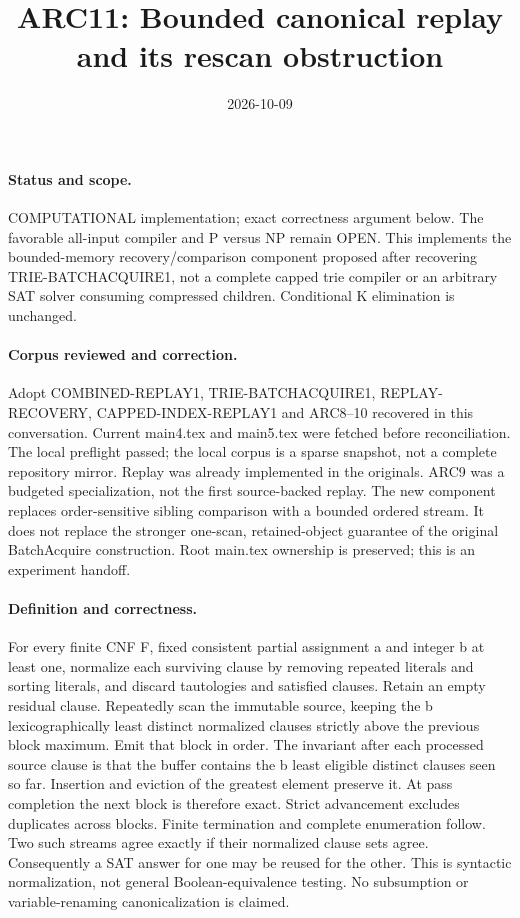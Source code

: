 \documentclass{article}
\title{ARC11: Bounded canonical replay and its rescan obstruction}
\date{2026-10-09}
\begin{document}
\maketitle
\paragraph{Status and scope.}
COMPUTATIONAL implementation; exact correctness argument below.
The favorable all-input compiler and P versus NP remain OPEN.
This implements the bounded-memory recovery/comparison component proposed
after recovering TRIE-BATCHACQUIRE1, not a complete capped trie compiler or
an arbitrary SAT solver consuming compressed children.
Conditional K elimination is unchanged.

\paragraph{Corpus reviewed and correction.}
Adopt COMBINED-REPLAY1, TRIE-BATCHACQUIRE1, REPLAY-RECOVERY,
CAPPED-INDEX-REPLAY1 and ARC8--10 recovered in this conversation.
Current main4.tex and main5.tex were fetched before reconciliation.
The local preflight passed; the local corpus is a sparse snapshot, not a
complete repository mirror. Replay was already implemented in the originals.
ARC9 was a budgeted specialization, not the first source-backed replay.
The new component replaces order-sensitive sibling comparison with a
bounded ordered stream. It does not replace the stronger one-scan,
retained-object guarantee of the original BatchAcquire construction.
Root main.tex ownership is preserved; this is an experiment handoff.

\paragraph{Definition and correctness.}
For every finite CNF F, fixed consistent partial assignment a and integer
b at least one, normalize each surviving clause by removing repeated
literals and sorting literals, and discard tautologies and satisfied clauses.
Retain an empty residual clause. Repeatedly scan the immutable source,
keeping the b lexicographically least distinct normalized clauses strictly
above the previous block maximum. Emit that block in order.
The invariant after each processed source clause is that the buffer contains
the b least eligible distinct clauses seen so far. Insertion and eviction of
the greatest element preserve it. At pass completion the next block is
therefore exact. Strict advancement excludes duplicates across blocks.
Finite termination and complete enumeration follow.
Two such streams agree exactly if their normalized clause sets agree.
Consequently a SAT answer for one may be reused for the other.
This is syntactic normalization, not general Boolean-equivalence testing.
No subsumption or variable-renaming canonicalization is claimed.
\end{document}
